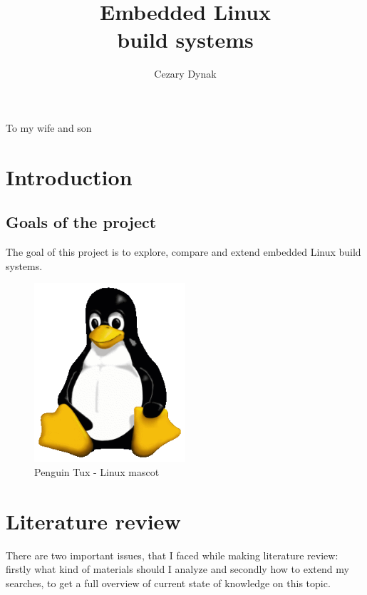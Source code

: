 \documentclass[printmode]{mgr}
\title{Embedded Linux \\ build systems}
\author{Cezary Dynak}
\begin{document}


\maketitle
\dedication{6cm}{To my wife and son}

\tableofcontents

\chapter{Introduction}
\section{Goals of the project}
The goal of this project is to explore, compare and extend embedded Linux build systems. \cite{web:bis-org-pl}
\begin{figure}[htbp]
  \centering
    \includegraphics[width=0.5\textwidth]{Tux.png}
  \caption{Penguin Tux - Linux mascot}
  \label{fig:panel-dotykowy}
\end{figure}

\chapter{Literature review}
\label{chapter:literature-review}

There are two important issues, that I faced while making literature review: firstly what kind of materials should I analyze and secondly how to extend my searches, to get a full overview of current state of knowledge on this topic.  \\
\end{document}

